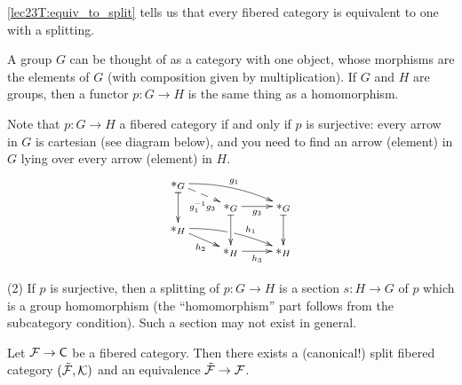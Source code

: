  \ref{lec23T:equiv_to_split} tells us that every fibered category is equivalent to one
 with a splitting.
 \begin{example}
   A group $G$ can be thought of as a category with one object, whose morphisms are the
   elements of $G$ (with composition given by multiplication). If $G$ and $H$ are
   groups, then a functor $p:G\to H$ is the same thing as a homomorphism.

   Note that $p:G\to H$ a fibered category if and only if $p$ is surjective: every arrow
   in $G$ is cartesian (see diagram below), and you need to find an arrow (element) in
   $G$ lying over every arrow (element) in $H$.
   \[\xymatrix@R-1.5pc{
    \ast_G \ar@{|->}[dd]\ar@{-->}[dr]_(.6){g_1^{-1}g_3} \ar@/^/[rrd]^{g_1}\\
     & \ast_G\ar@{|->}[dd] \ar[r]_{g_3} & \ast_G \ar@{|->}[dd]\\
    \ast_H \ar[dr]_{h_2} \ar@/^/[rrd]^(.65){h_1}|!{[ru];[rd]}\hole \\
    & \ast_H \ar[r]_{h_3} & \ast_H
   }\]

   (2) If $p$ is surjective, then a splitting of $p:G\to H$ is a section $s:H\to G$ of
   $p$ which is a group homomorphism (the ``homomorphism'' part follows from the
   subcategory condition). Such a section may not exist in general.
 \end{example}
 \begin{theorem}\label{lec23T:equiv_to_split}
   Let $\mathcal{F}\to \text{\sf C}$ be a fibered category. Then there exists a (canonical!) split fibered
   category $(\tilde {\mathcal{F}},\mathcal{K})$ and an equivalence $\tilde {\mathcal{F}}\to \mathcal{F}$.
 \end{theorem}
